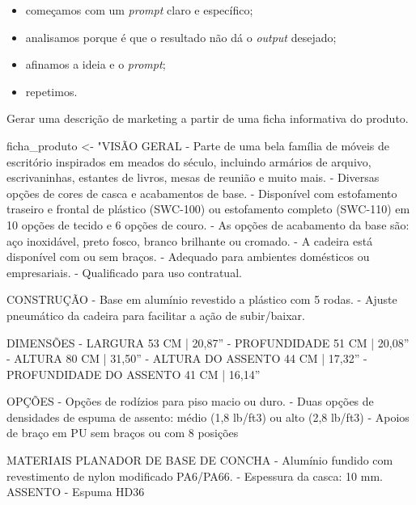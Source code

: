 \documentclass[
  letterpaper,
  paper=6in:9in,
  pagesize=pdftex,
  headinclude=on,
  footinclude=on,
  12pt]{scrbook}
\newenvironment{Shaded}{\begin{snugshade}}{\end{snugshade}}
\newcommand{\NormalTok}[1]{\textcolor[rgb]{0.00,0.23,0.31}{#1}}
\newcommand{\OtherTok}[1]{\textcolor[rgb]{0.00,0.23,0.31}{#1}}
\newcommand{\StringTok}[1]{\textcolor[rgb]{0.13,0.47,0.30}{#1}}
\providecommand{\tightlist}{%
  \setlength{\itemsep}{0pt}\setlength{\parskip}{0pt}}\usepackage{longtable,booktabs,array}
\begin{document}
\begin{itemize}
\tightlist
\item
  começamos com um \emph{prompt} claro e específico;
\item
  analisamos porque é que o resultado não dá o \emph{output} desejado;
\item
  afinamos a ideia e o \emph{prompt};
\item
  repetimos.
\end{itemize}

Gerar uma descrição de marketing a partir de uma ficha informativa do
produto.

\begin{Shaded}
\begin{Highlighting}[]
\NormalTok{ficha\_produto }\OtherTok{\textless{}{-}} \StringTok{"VISÃO GERAL}
\StringTok{{-} Parte de uma bela família de móveis de escritório inspirados em meados do século,}
\StringTok{incluindo armários de arquivo, escrivaninhas, estantes de livros, mesas de reunião e muito mais.}
\StringTok{{-} Diversas opções de cores de casca e acabamentos de base.}
\StringTok{{-} Disponível com estofamento traseiro e frontal de plástico (SWC{-}100)}
\StringTok{ou estofamento completo (SWC{-}110) em 10 opções de tecido e 6 opções de couro.}
\StringTok{{-} As opções de acabamento da base são: aço inoxidável, preto fosco,}
\StringTok{branco brilhante ou cromado.}
\StringTok{{-} A cadeira está disponível com ou sem braços.}
\StringTok{{-} Adequado para ambientes domésticos ou empresariais.}
\StringTok{{-} Qualificado para uso contratual.}

\StringTok{CONSTRUÇÃO}
\StringTok{{-} Base em alumínio revestido a plástico com 5 rodas.}
\StringTok{{-} Ajuste pneumático da cadeira para facilitar a ação de subir/baixar.}

\StringTok{DIMENSÕES}
\StringTok{{-} LARGURA 53 CM | 20,87”}
\StringTok{{-} PROFUNDIDADE 51 CM | 20,08”}
\StringTok{{-} ALTURA 80 CM | 31,50”}
\StringTok{{-} ALTURA DO ASSENTO 44 CM | 17,32”}
\StringTok{{-} PROFUNDIDADE DO ASSENTO 41 CM | 16,14”}

\StringTok{OPÇÕES}
\StringTok{{-} Opções de rodízios para piso macio ou duro.}
\StringTok{{-} Duas opções de densidades de espuma de assento:}
\StringTok{ médio (1,8 lb/ft3) ou alto (2,8 lb/ft3)}
\StringTok{{-} Apoios de braço em PU sem braços ou com 8 posições}

\StringTok{MATERIAIS}
\StringTok{PLANADOR DE BASE DE CONCHA}
\StringTok{{-} Alumínio fundido com revestimento de nylon modificado PA6/PA66.}
\StringTok{{-} Espessura da casca: 10 mm.}
\StringTok{ASSENTO}
\StringTok{{-} Espuma HD36}


\end{Highlighting}
\end{Shaded}
\end{document}
